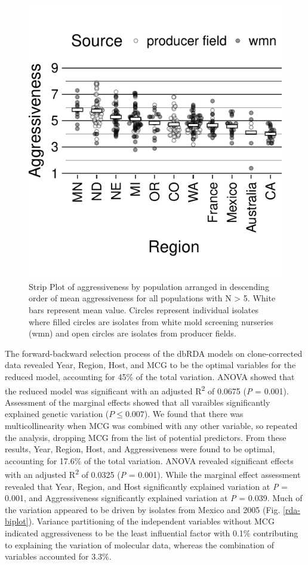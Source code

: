 \documentclass[fleqn,10pt,lineno]{wlpeerj} %
\theoremstyle{definition}
\theoremstyle{definition}
\theoremstyle{definition}
\theoremstyle{remark}
\begin{document}
\begin{figure}
\centering
\includegraphics{../../results/figures/publication/aggressiveness.pdf}
\caption{Strip Plot of aggressiveness by population arranged in
descending order of mean aggressiveness for all populations with N
\textgreater{} 5. White bars represent mean value. Circles represent
individual isolates where filled circles are isolates from white mold
screening nurseries (wmn) and open circles are isolates from producer
fields.}\label{aggressiveness-boxplot}
\end{figure}

The forward-backward selection process of the dbRDA models on
clone-corrected data revealed Year, Region, Host, and MCG to be the
optimal variables for the reduced model, accounting for 45\% of the
total variation. ANOVA showed that the reduced model was significant
with an adjusted R\textsuperscript{2} of 0.0675 (\emph{P} = 0.001).
Assessment of the marginal effects showed that all varaibles
significantly explained genetic variation (\(P \leq 0.007\)). We found
that there was multicollinearity when MCG was combined with any other
variable, so repeated the analysis, dropping MCG from the list of
potential predictors. From these results, Year, Region, Host, and
Aggressiveness were found to be optimal, accounting for 17.6\% of the
total variation. ANOVA revealed significant effects with an adjusted
R\textsuperscript{2} of 0.0325 (\emph{P} = 0.001). While the marginal
effect assessment revealed that Year, Region, and Host significantly
explained variation at \emph{P} = 0.001, and Aggressiveness
significantly explained variation at \emph{P} = 0.039. Much of the
variation appeared to be driven by isolates from Mexico and 2005 (Fig.
\ref{rda-biplot}). Variance partitioning of the independent variables
without MCG indicated aggressiveness to be the least influential factor
with 0.1\% contributing to explaining the variation of molecular data,
whereas the combination of variables accounted for 3.3\%.
\end{document}
